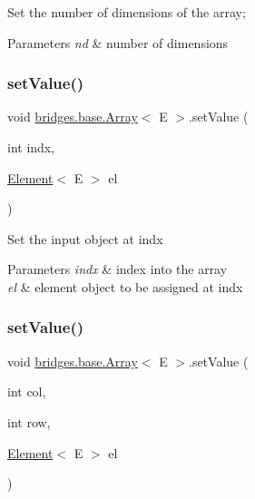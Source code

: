 Set the number of dimensions of the array;


\begin{DoxyParams}{Parameters}
{\em nd} & number of dimensions \\
\hline
\end{DoxyParams}
\hypertarget{classbridges_1_1base_1_1_array_af2d5b5e252f35e740ff4d89c22089ece}{}\label{classbridges_1_1base_1_1_array_af2d5b5e252f35e740ff4d89c22089ece} 
\subsubsection{\texorpdfstring{set\+Value()}{setValue()}\hspace{0.1cm}{\footnotesize\ttfamily [1/3]}}
{\footnotesize\ttfamily void \hyperlink{classbridges_1_1base_1_1_array}{bridges.\+base.\+Array}$<$ E $>$.set\+Value (\begin{DoxyParamCaption}\item[{int}]{indx,  }\item[{\hyperlink{classbridges_1_1base_1_1_element}{Element}$<$ E $>$}]{el }\end{DoxyParamCaption})}

Set the input object at \textquotesingle{}indx\textquotesingle{}


\begin{DoxyParams}{Parameters}
{\em indx} & index into the array \\
\hline
{\em el} & element object to be assigned at \textquotesingle{}indx\textquotesingle{} \\
\hline
\end{DoxyParams}
\hypertarget{classbridges_1_1base_1_1_array_a9344b1197e5418ddb49f9c0c54472c90}{}\label{classbridges_1_1base_1_1_array_a9344b1197e5418ddb49f9c0c54472c90} 
\subsubsection{\texorpdfstring{set\+Value()}{setValue()}\hspace{0.1cm}{\footnotesize\ttfamily [2/3]}}
{\footnotesize\ttfamily void \hyperlink{classbridges_1_1base_1_1_array}{bridges.\+base.\+Array}$<$ E $>$.set\+Value (\begin{DoxyParamCaption}\item[{int}]{col,  }\item[{int}]{row,  }\item[{\hyperlink{classbridges_1_1base_1_1_element}{Element}$<$ E $>$}]{el }\end{DoxyParamCaption})}

